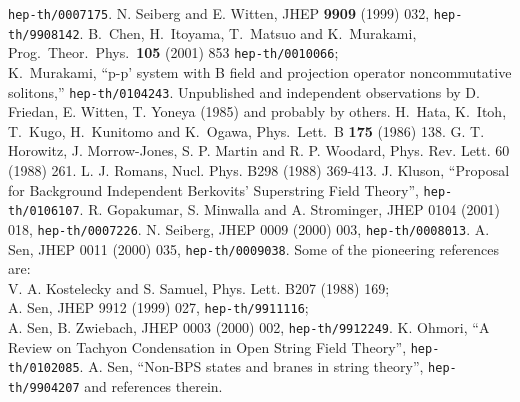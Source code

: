 \documentclass[a4paper,12pt]{article}
\begin{document}
\begin{thebibliography}{99}
{\tt hep-th/0007175}.
 N. Seiberg and E. Witten,
JHEP {\bf 9909} (1999) 032, {\tt hep-th/9908142}.
B.~Chen, H.~Itoyama, T.~Matsuo and K.~Murakami,
Prog.\ Theor.\ Phys.\  {\bf 105} (2001) 853
{\tt hep-th/0010066};\\
K.~Murakami,
``p-p' system with B field and projection operator noncommutative  solitons,''
{\tt hep-th/0104243}.
 Unpublished and independent
observations by D. Friedan, E. Witten,  T. Yoneya (1985)
and probably by others.
 H.~Hata, K.~Itoh, T.~Kugo, H.~Kunitomo and K.~Ogawa,
Phys.\ Lett.\ B {\bf 175} (1986) 138.
 G. T. Horowitz, J. Morrow-Jones, S. P. Martin
and R. P. Woodard, Phys. Rev. Lett. 60 (1988) 261.
 L. J. Romans, 
Nucl. Phys. B298 (1988) 369-413.
 J. Kluson, ``Proposal for Background Independent
Berkovits' Superstring Field Theory'', {\tt hep-th/0106107}.
 R. Gopakumar, S. Minwalla and A. Strominger,
JHEP 0104 (2001) 018, {\tt hep-th/0007226}.
 N. Seiberg, JHEP 0009 (2000) 003, 
{\tt hep-th/0008013}.
 A. Sen, JHEP 0011 (2000) 035, {\tt hep-th/0009038}.
 Some of the pioneering references are:\\
V. A. Kostelecky and S. Samuel, Phys. Lett. B207 (1988)  169;\\
A. Sen, JHEP 9912 (1999) 027, {\tt hep-th/9911116};\\
A. Sen, B. Zwiebach, JHEP 0003 (2000) 002, {\tt hep-th/9912249}.
 K. Ohmori, ``A Review on Tachyon Condensation
in Open String Field Theory'', {\tt hep-th/0102085}.
%
 A. Sen, ``Non-BPS states and branes in string theory'',
{\tt hep-th/9904207} and references therein.
\end{thebibliography}
\end{document}
